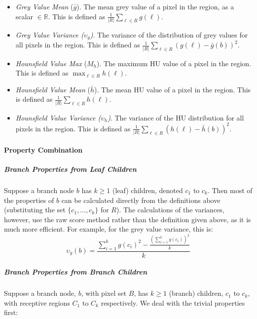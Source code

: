 \begin{itemize}
\item \emph{Grey Value Mean} ($\bar{g}$). The mean grey value of a pixel in the region, as a scalar $\in \mathbb{R}$. This is defined as $\displaystyle \frac{1}{|R|} \sum_{\ell \in R} g(\ell)$.

\item \emph{Grey Value Variance ($\upsilon_g$)}. The variance of the distribution of grey values for all pixels in the region. This is defined as $\displaystyle \frac{1}{|R|} \sum_{\ell \in R} (g(\ell) - \bar{g}(b))^2$.

\item \emph{Hounsfield Value Max} ($M_h$). The maximum HU value of a pixel in the region. This is defined as $\displaystyle \max_{\ell \in R} h(\ell)$.

\item \emph{Hounsfield Value Mean} ($\bar{h}$). The mean HU value of a pixel in the region. This is defined as $\displaystyle \frac{1}{|R|} \sum_{\ell \in R} h(\ell)$.

\item \emph{Hounsfield Value Variance ($\upsilon_h$)}. The variance of the HU distribution for all pixels in the region. This is defined as $\displaystyle \frac{1}{|R|} \sum_{\ell \in R} (h(\ell) - \bar{h}(b))^2$.

\end{itemize}

\enlargethispage*{\baselineskip}

\paragraph{Property Combination}

\subparagraph{Branch Properties from Leaf Children}

Suppose a branch node $b$ has $k \ge 1$ (leaf) children, denoted $c_1$ to $c_k$. Then most of the properties of $b$ can be calculated directly from the definitions above (substituting the set $\{c_1,\ldots,c_k\}$ for $R$). The calculations of the variances, however, use the raw score method rather than the definition given above, as it is much more efficient. For example, for the grey value variance, this is:
%
\[
\upsilon_g(b) = \frac{\sum_{i=1}^k g(c_i)^2 - \frac{(\sum_{i=1}^k g(c_i))^2}{k}}{k}
\]

\subparagraph{Branch Properties from Branch Children}

Suppose a branch node, $b$, with pixel set $B$, has $k \ge 1$ (branch) children, $c_1$ to $c_k$, with receptive regions $C_1$ to $C_k$ respectively. We deal with the trivial properties first:

